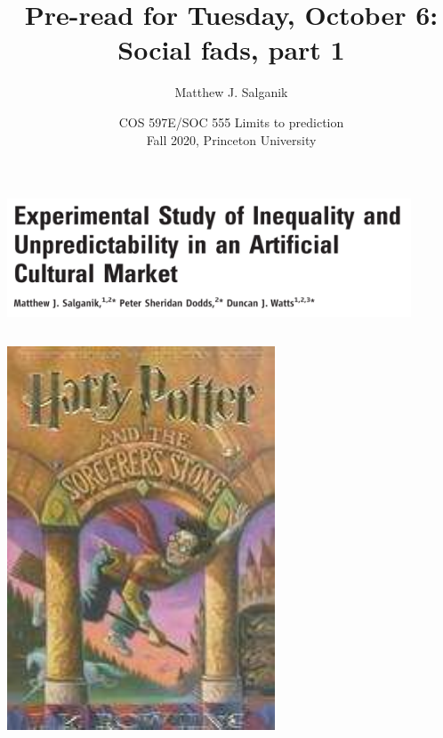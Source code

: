 \documentclass[aspectratio=169]{beamer}
\title[]{Pre-read for Tuesday, October 6:\\Social fads, part 1}
\author[]{Matthew J. Salganik}
\institute[]{}
\date[]{COS 597E/SOC 555 Limits to prediction\\Fall 2020, Princeton University}
\begin{document}
\frame{\titlepage}
\begin{frame}

\begin{center}
  \includegraphics[width = 0.9\textwidth]{figures/salganik_experimental_2006_title}
\end{center}

\end{frame}
\begin{frame}

  \begin{columns}
     \begin{block}{}
       \includegraphics[width=\textwidth]{figures/hp-cover.pdf}
     \end{block}


\end{columns}
\end{frame}
\end{document}
